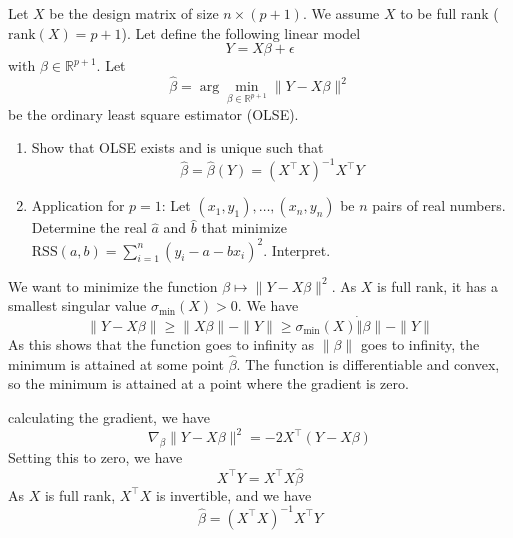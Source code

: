\begin{exercise}
Let \(X\) be the design matrix of size \(n \times (p + 1)\). We assume \(X\) to be full rank (\(\text{rank}(X) = p + 1\)). Let define the following linear model
\[Y = X\beta + \epsilon\]
with \(\beta \in \mathbb{R}^{p+1}\). Let
\[\hat{\beta} = \arg \min_{\beta \in \mathbb{R}^{p+1}} \|Y - X\beta\|^2\]
be the ordinary least square estimator (OLSE).

\begin{enumerate}
    \item Show that OLSE exists and is unique such that
    \[\hat{\beta} = \hat{\beta}(Y) = (X^{\top}X)^{-1}X^{\top}Y\]

    \item Application for \(p = 1\): Let \((x_1, y_1), \ldots, (x_n, y_n)\) be \(n\) pairs of real numbers. Determine the real \(\hat{a}\) and \(\hat{b}\) that minimize \(\text{RSS}(a, b) = \sum_{i=1}^n (y_i - a - bx_i)^2\). Interpret.
\end{enumerate}
\end{exercise}

\begin{answerenum}
    \item We want to minimize the function \( \beta \mapsto \| Y - X\beta \|^2 \).
      As \( X \) is full rank, it has a smallest singular value \( \sigma_{\min}(X) > 0 \). We have
      \[
        \| Y - X\beta \| \geq  \| X\beta \| - \|Y\| \geq \sigma_{\min}(X) \dot \|\beta\| - \|Y\|
      \]
      As this shows that the function goes to infinity as \( \|\beta\| \) goes to infinity, the minimum is attained at some point \( \widehat{\beta} \). The function is differentiable and convex, so the minimum is attained at a point where the gradient is zero. 
      
      calculating the gradient, we have
      \[
        \nabla_\beta \| Y - X\beta \|^2 = -2X^{\top}(Y - X\beta)
      \]
      Setting this to zero, we have
      \[
          X^{\top}Y = X^{\top}X\widehat{\beta}
      \]
      As \( X \) is full rank, \( X^{\top}X \) is invertible, and we have
      \[
        \widehat{\beta} = (X^{\top}X)^{-1}X^{\top}Y
      \]
\end{answerenum}
